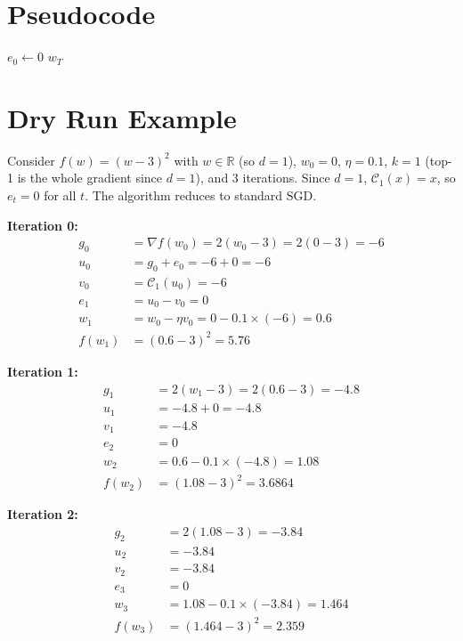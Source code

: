 \documentclass{article}
\begin{document}
\section*{Pseudocode}
\begin{algorithm}[H]
\SetAlgoLined
{}
$e_0 \gets 0$ \;
\Return $w_T$
\caption{Top-K EF-SGD}
\end{algorithm}

\section*{Dry Run Example}
Consider $f(w) = (w-3)^2$ with $w \in \mathbb{R}$ (so $d=1$), $w_0 = 0$, $\eta = 0.1$, $k=1$ (top-1 is the whole gradient since $d=1$), and 3 iterations. Since $d=1$, $\mathcal{C}_1(x) = x$, so $e_t = 0$ for all $t$. The algorithm reduces to standard SGD.

\textbf{Iteration 0:}
\begin{align*}
    g_0 &= \nabla f(w_0) = 2(w_0 - 3) = 2(0-3) = -6 \\
    u_0 &= g_0 + e_0 = -6 + 0 = -6 \\
    v_0 &= \mathcal{C}_1(u_0) = -6 \\
    e_1 &= u_0 - v_0 = 0 \\
    w_1 &= w_0 - \eta v_0 = 0 - 0.1 \times (-6) = 0.6 \\
    f(w_1) &= (0.6 - 3)^2 = 5.76
\end{align*}

\textbf{Iteration 1:}
\begin{align*}
    g_1 &= 2(w_1 - 3) = 2(0.6 - 3) = -4.8 \\
    u_1 &= -4.8 + 0 = -4.8 \\
    v_1 &= -4.8 \\
    e_2 &= 0 \\
    w_2 &= 0.6 - 0.1 \times (-4.8) = 1.08 \\
    f(w_2) &= (1.08 - 3)^2 = 3.6864
\end{align*}

\textbf{Iteration 2:}
\begin{align*}
    g_2 &= 2(1.08 - 3) = -3.84 \\
    u_2 &= -3.84 \\
    v_2 &= -3.84 \\
    e_3 &= 0 \\
    w_3 &= 1.08 - 0.1 \times (-3.84) = 1.464 \\
    f(w_3) &= (1.464 - 3)^2 = 2.359
\end{align*}
\end{document}
